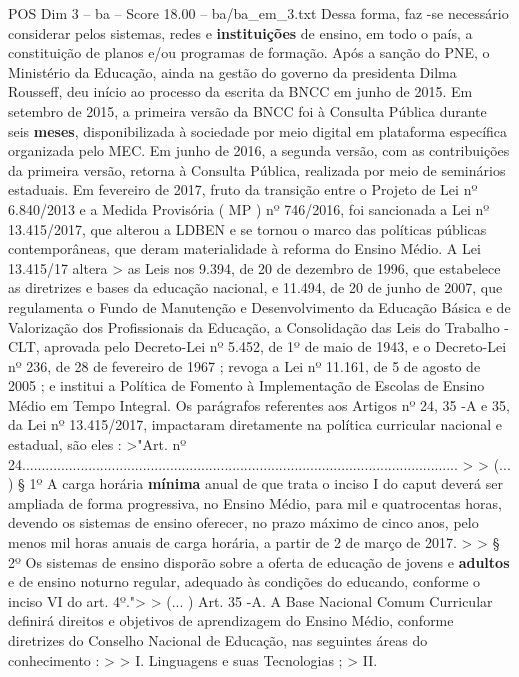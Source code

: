 \begin{textsample}{POS Dim 3 – ba – Score 18.00 – ba/ba\_em\_3.txt}
Dessa forma, faz -se necessário considerar pelos sistemas, redes e \textbf{instituições} de ensino, em todo o país, a constituição de planos e/ou programas de formação.
Após a sanção do PNE, o Ministério da Educação, ainda na gestão do governo da presidenta Dilma Rousseff, deu início ao processo da escrita da BNCC em junho de 2015.
Em setembro de 2015, a primeira versão da BNCC foi à Consulta Pública durante seis \textbf{meses}, disponibilizada à sociedade por meio digital em plataforma específica organizada pelo MEC.
Em junho de 2016, a segunda versão, com as contribuições da primeira versão, retorna à Consulta Pública, realizada por meio de seminários estaduais.
Em fevereiro de 2017, fruto da transição entre o Projeto de Lei nº 6.840/2013 e a Medida Provisória ( MP ) nº 746/2016, foi sancionada a Lei nº 13.415/2017, que alterou a LDBEN e se tornou o marco das políticas públicas contemporâneas, que deram materialidade à reforma do Ensino Médio.
A Lei 13.415/17 altera > as Leis nos 9.394, de 20 de dezembro de 1996, que estabelece as diretrizes e bases da educação nacional, e 11.494, de 20 de junho de 2007, que regulamenta o Fundo de Manutenção e Desenvolvimento da Educação Básica e de Valorização dos Profissionais da Educação, a Consolidação das Leis do Trabalho - CLT, aprovada pelo Decreto-Lei nº 5.452, de 1º de maio de 1943, e o Decreto-Lei nº 236, de 28 de fevereiro de 1967 ; revoga a Lei nº 11.161, de 5 de agosto de 2005 ; e institui a Política de Fomento à Implementação de Escolas de Ensino Médio em Tempo Integral.
Os parágrafos referentes aos Artigos nº 24, 35 -A e 35, da Lei nº 13.415/2017, impactaram diretamente na política curricular nacional e estadual, são eles : >"Art. nº 24................................................................................................................ > > (... ) § 1º A carga horária \textbf{mínima} anual de que trata o inciso I do caput deverá ser ampliada de forma progressiva, no Ensino Médio, para mil e quatrocentas horas, devendo os sistemas de ensino oferecer, no prazo máximo de cinco anos, pelo menos mil horas anuais de carga horária, a partir de 2 de março de 2017. > > § 2º Os sistemas de ensino disporão sobre a oferta de educação de jovens e \textbf{adultos} e de ensino noturno regular, adequado às condições do educando, conforme o inciso VI do art. 4º."> > (... ) Art. 35 -A.
A Base Nacional Comum Curricular definirá direitos e objetivos de aprendizagem do Ensino Médio, conforme diretrizes do Conselho Nacional de Educação, nas seguintes áreas do conhecimento : > > I.
Linguagens e suas Tecnologias ; > II.

\end{textsample}
